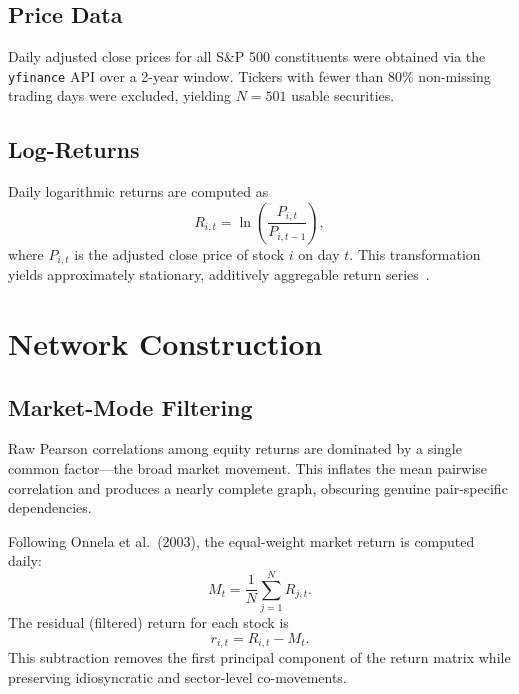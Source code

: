 \documentclass[11pt, a4paper]{article}
\begin{document}
\subsection{Price Data}
Daily adjusted close prices for all S\&P 500 constituents were obtained via the \texttt{yfinance} API over a 2-year window. Tickers with fewer than 80\% non-missing trading days were excluded, yielding $N=501$ usable securities.

\subsection{Log-Returns}
Daily logarithmic returns are computed as
\begin{equation}
    R_{i,t} = \ln \left( \frac{P_{i,t}}{P_{i,t-1}} \right),
\end{equation}
where $P_{i,t}$ is the adjusted close price of stock $i$ on day $t$. This transformation yields approximately stationary, additively aggregable return series~\citep{mantegna1999introduction}.

\section{Network Construction}

\subsection{Market-Mode Filtering}
Raw Pearson correlations among equity returns are dominated by a single common factor---the broad market movement. This inflates the mean pairwise correlation and produces a nearly complete graph, obscuring genuine pair-specific dependencies.

Following Onnela et al.~(2003), the equal-weight market return is computed daily:
\begin{equation}
    M_{t} = \frac{1}{N} \sum_{j=1}^{N} R_{j,t}.
\end{equation}
The residual (filtered) return for each stock is
\begin{equation}
    r_{i,t} = R_{i,t} - M_t.
\end{equation}
This subtraction removes the first principal component of the return matrix while preserving idiosyncratic and sector-level co-movements.
\end{document}
